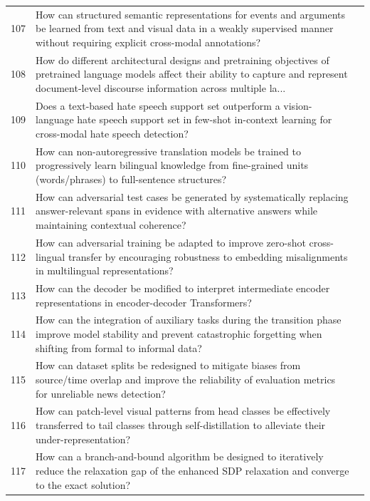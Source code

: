 \begin{longtable}{p{0.8cm}p{9cm}p{2.5cm}}
107 & How can structured semantic representations for events and arguments be learned from text and visual data in a weakly supervised manner without requiring explicit cross-modal annotations? & \cite{10.18653/v1/2020.acl-main.230} \\
108 & How do different architectural designs and pretraining objectives of pretrained language models affect their ability to capture and represent document-level discourse information across multiple la... & \cite{10.18653/v1/2021.naacl-main.301} \\
109 & Does a text-based hate speech support set outperform a vision-language hate speech support set in few-shot in-context learning for cross-modal hate speech detection? & \cite{10.18653/v1/2024.emnlp-main.445} \\
110 & How can non-autoregressive translation models be trained to progressively learn bilingual knowledge from fine-grained units (words/phrases) to full-sentence structures? & \cite{10.18653/v1/2021.findings-acl.247} \\
111 & How can adversarial test cases be generated by systematically replacing answer-relevant spans in evidence with alternative answers while maintaining contextual coherence? & \cite{10.18653/v1/2024.findings-naacl.85} \\
112 & How can adversarial training be adapted to improve zero-shot cross-lingual transfer by encouraging robustness to embedding misalignments in multilingual representations? & \cite{10.18653/v1/2021.emnlp-main.126} \\
113 & How can the decoder be modified to interpret intermediate encoder representations in encoder-decoder Transformers? & \cite{10.18653/v1/2024.findings-naacl.296} \\
114 & How can the integration of auxiliary tasks during the transition phase improve model stability and prevent catastrophic forgetting when shifting from formal to informal data? & \cite{10.18653/v1/2020.findings-emnlp.282} \\
115 & How can dataset splits be redesigned to mitigate biases from source/time overlap and improve the reliability of evaluation metrics for unreliable news detection? & \cite{10.18653/v1/2021.eacl-main.211} \\
116 & How can patch-level visual patterns from head classes be effectively transferred to tail classes through self-distillation to alleviate their under-representation? & \cite{10.1609/aaai.v38i6.28459} \\
117 & How can a branch-and-bound algorithm be designed to iteratively reduce the relaxation gap of the enhanced SDP relaxation and converge to the exact solution? & \cite{10.1609/aaai.v37i12.26745} \\

\end{longtable}
